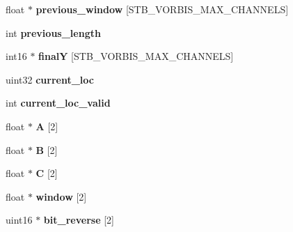 \begin{DoxyCompactItemize}
\item 
float $\ast$ {\bfseries previous\+\_\+window} \mbox{[}S\+T\+B\+\_\+\+V\+O\+R\+B\+I\+S\+\_\+\+M\+A\+X\+\_\+\+C\+H\+A\+N\+N\+E\+LS\mbox{]}\hypertarget{structstb__vorbis_a00c9f41a45acaa1dfe85a3c02d215728}{}\label{structstb__vorbis_a00c9f41a45acaa1dfe85a3c02d215728}

\item 
int {\bfseries previous\+\_\+length}\hypertarget{structstb__vorbis_a61473d87688517c64ab951538ae1f14f}{}\label{structstb__vorbis_a61473d87688517c64ab951538ae1f14f}

\item 
int16 $\ast$ {\bfseries finalY} \mbox{[}S\+T\+B\+\_\+\+V\+O\+R\+B\+I\+S\+\_\+\+M\+A\+X\+\_\+\+C\+H\+A\+N\+N\+E\+LS\mbox{]}\hypertarget{structstb__vorbis_a70c300d807fef43284883a75ad70e2a4}{}\label{structstb__vorbis_a70c300d807fef43284883a75ad70e2a4}

\item 
uint32 {\bfseries current\+\_\+loc}\hypertarget{structstb__vorbis_a02d0be708a62def848df1b4c20402983}{}\label{structstb__vorbis_a02d0be708a62def848df1b4c20402983}

\item 
int {\bfseries current\+\_\+loc\+\_\+valid}\hypertarget{structstb__vorbis_a22ce054c836820c3b8381d6c8fa610ed}{}\label{structstb__vorbis_a22ce054c836820c3b8381d6c8fa610ed}

\item 
float $\ast$ {\bfseries A} \mbox{[}2\mbox{]}\hypertarget{structstb__vorbis_a1dbabeed4f6505a76789914f16772975}{}\label{structstb__vorbis_a1dbabeed4f6505a76789914f16772975}

\item 
float $\ast$ {\bfseries B} \mbox{[}2\mbox{]}\hypertarget{structstb__vorbis_ad11922956a823e4954c3778b2231fac3}{}\label{structstb__vorbis_ad11922956a823e4954c3778b2231fac3}

\item 
float $\ast$ {\bfseries C} \mbox{[}2\mbox{]}\hypertarget{structstb__vorbis_a24d929ad328049cddb34951233c8ee74}{}\label{structstb__vorbis_a24d929ad328049cddb34951233c8ee74}

\item 
float $\ast$ {\bfseries window} \mbox{[}2\mbox{]}\hypertarget{structstb__vorbis_a4437be2f348106017c23ffc1ebc57980}{}\label{structstb__vorbis_a4437be2f348106017c23ffc1ebc57980}

\item 
uint16 $\ast$ {\bfseries bit\+\_\+reverse} \mbox{[}2\mbox{]}\hypertarget{structstb__vorbis_a7619bd93c5c9d8e1fbe5f172ddca1797}{}\label{structstb__vorbis_a7619bd93c5c9d8e1fbe5f172ddca1797}


\end{DoxyCompactItemize}
